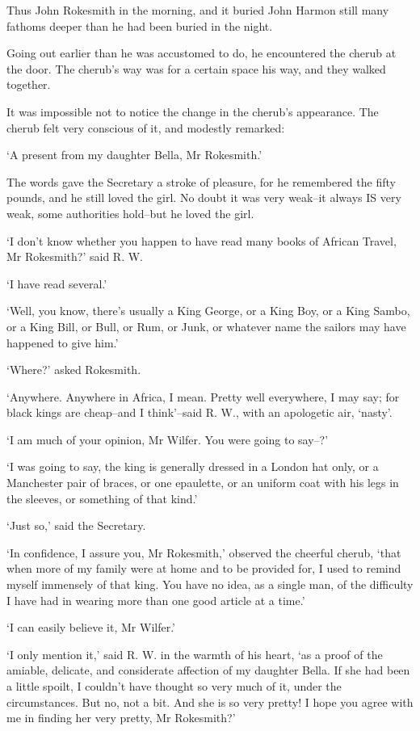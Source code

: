Thus John Rokesmith in the morning, and it buried John Harmon still many
fathoms deeper than he had been buried in the night.

Going out earlier than he was accustomed to do, he encountered the
cherub at the door. The cherub’s way was for a certain space his way,
and they walked together.

It was impossible not to notice the change in the cherub’s appearance.
The cherub felt very conscious of it, and modestly remarked:

‘A present from my daughter Bella, Mr Rokesmith.’

The words gave the Secretary a stroke of pleasure, for he remembered the
fifty pounds, and he still loved the girl. No doubt it was very weak--it
always IS very weak, some authorities hold--but he loved the girl.

‘I don’t know whether you happen to have read many books of African
Travel, Mr Rokesmith?’ said R. W.

‘I have read several.’

‘Well, you know, there’s usually a King George, or a King Boy, or a King
Sambo, or a King Bill, or Bull, or Rum, or Junk, or whatever name the
sailors may have happened to give him.’

‘Where?’ asked Rokesmith.

‘Anywhere. Anywhere in Africa, I mean. Pretty well everywhere, I may
say; for black kings are cheap--and I think’--said R. W., with an
apologetic air, ‘nasty’.

‘I am much of your opinion, Mr Wilfer. You were going to say--?’

‘I was going to say, the king is generally dressed in a London hat only,
or a Manchester pair of braces, or one epaulette, or an uniform coat
with his legs in the sleeves, or something of that kind.’

‘Just so,’ said the Secretary.

‘In confidence, I assure you, Mr Rokesmith,’ observed the cheerful
cherub, ‘that when more of my family were at home and to be provided
for, I used to remind myself immensely of that king. You have no idea,
as a single man, of the difficulty I have had in wearing more than one
good article at a time.’

‘I can easily believe it, Mr Wilfer.’

‘I only mention it,’ said R. W. in the warmth of his heart, ‘as a proof
of the amiable, delicate, and considerate affection of my daughter
Bella. If she had been a little spoilt, I couldn’t have thought so very
much of it, under the circumstances. But no, not a bit. And she is so
very pretty! I hope you agree with me in finding her very pretty, Mr
Rokesmith?’

